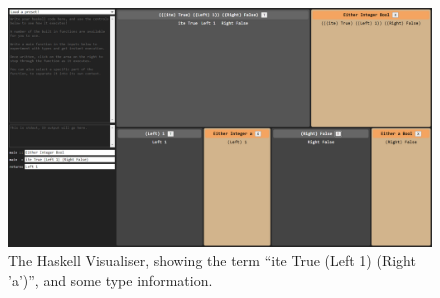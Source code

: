 \begin{figure}
    \centering
    \includegraphics[width=1\linewidth]{chapters//1-introduction//resources/example.png}
    \caption{The Haskell Visualiser, showing the term ``ite True (Left 1) (Right 'a')'', and some type information.}
    \label{fig:broad-example}
\end{figure}